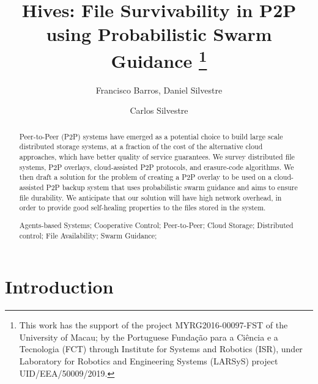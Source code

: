 \documentclass[runningheads]{llncs}
\begin{document}
\title {Hives: File Survivability in P2P using Probabilistic Swarm Guidance
\thanks{This work has the support of the project MYRG2016-00097-FST of the University of Macau; by the Portuguese Fundação para a Ciência e a Tecnologia (FCT) through Institute for Systems and Robotics (ISR), under Laboratory for Robotics and Engineering Systems (LARSyS) project UID/EEA/50009/2019.}
}
\author{Francisco Barros, Daniel Silvestre \and Carlos Silvestre}
\maketitle
\begin{abstract}
Peer-to-Peer (P2P) systems have emerged as a potential choice to build large scale distributed storage systems, at a fraction of the cost of the alternative cloud approaches, which have better quality of service guarantees. We survey  distributed file systems, P2P overlays, cloud-assisted P2P protocols, and erasure-code algorithms. We then draft a solution for the problem of creating a P2P overlay to be used on a cloud-assisted P2P backup system that uses probabilistic swarm guidance and aims to ensure file durability. We anticipate that our solution will have high network overhead, in order to provide good self-healing properties to the files stored in the system.

\begin{keywords}Agents-based Systems; Cooperative Control; Peer-to-Peer; Cloud Storage; Distributed control; File Availability; Swarm Guidance;\end{keywords}
\end{abstract}

\setcounter{tocdepth}{3}
\tableofcontents

\newpage\section{Introduction}\label{sec:intro}
\end{document}
